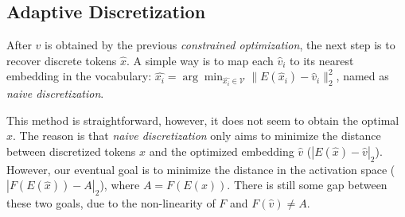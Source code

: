 \subsection{Adaptive Discretization}
After $\hat{v}$ is obtained by the previous \textit{constrained optimization}, the next step is to recover discrete tokens $\hat{x}$. %
A simple way is to map each $\hat{v}_i$ to its nearest embedding in the vocabulary: $\hat{x_i}=\arg\min_{\hat{x_i} \in \mathcal{V}} \| E(\hat{x}_i)-\hat{v}_i \|_2^2$, named as \textit{naive discretization}.


This method is straightforward, however, it does not seem to obtain the optimal $\hat{x}$. %
The reason is that \textit{naive discretization} only aims to minimize the distance between discretized tokens $\hat{x}$ and the optimized embedding $\hat{v}$ ($| E(\hat{x}) - \hat{v} |_2$). However, our eventual goal is to minimize the distance in the activation space ($| F(E(\hat{x})) - A |_2$), where $A=F(E(x))$.
There is still some gap between these two goals, due to the non-linearity of $F$ and $F(\hat{v})\neq A$.


